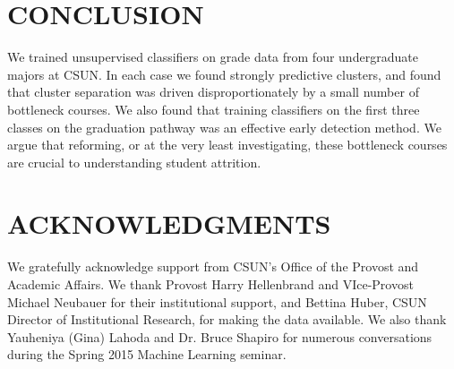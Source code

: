 \documentclass{sigchi}
\begin{document}
\section{CONCLUSION}

We trained unsupervised classifiers on grade data from four undergraduate majors at CSUN. In each case we found strongly predictive clusters, and found that cluster separation was driven disproportionately by a small number of bottleneck courses. We also found that training classifiers on the first three classes on the graduation pathway was an effective early detection method. We argue that reforming, or at the very least investigating, these bottleneck courses are crucial to understanding student attrition.



\section{ACKNOWLEDGMENTS}

We gratefully acknowledge support from CSUN’s Office of the Provost and Academic Affairs. We thank Provost Harry Hellenbrand and VIce-Provost Michael Neubauer for their institutional support, and Bettina Huber, CSUN Director of Institutional Research, for making the data available. We also thank Yauheniya (Gina) Lahoda and Dr. Bruce Shapiro for numerous conversations during the Spring 2015 Machine Learning seminar. 



\balance{}


\end{document}
